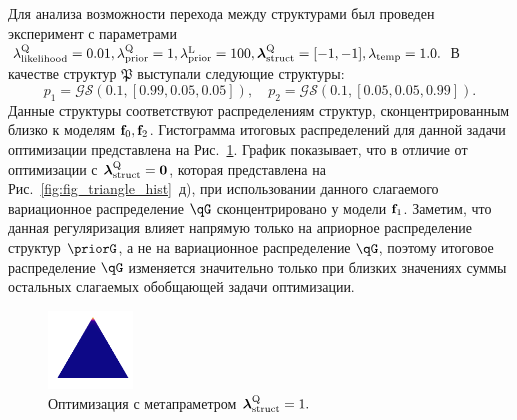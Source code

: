 Для анализа возможности перехода между структурами был проведен эксперимент с параметрами 
$\lambda_\text{likelihood}^\text{Q} = 0.01, \lambda_\text{prior}^\text{Q} = 1, \lambda_\text{prior}^\text{L} = 100, \boldsymbol{\lambda}_\text{struct}^\text{Q} = [-1, -1], \lambda_{\text{temp}} = 1.0.$
В качестве структур $\mathfrak{P}$ выступали следующие структуры:
\[
    p_1  =  \mathcal{GS}(0.1, [0.99, 0.05, 0.05]), \quad p_2  =  \mathcal{GS}(0.1, [0.05, 0.05, 0.99]).
\]
Данные структуры соответствуют распределениям структур, сконцентрированным близко к моделям $\mathbf{f}_0, \mathbf{f}_2$.
Гистограмма итоговых распределений для данной задачи оптимизации представлена на Рис.~\ref{fig:structure_comb_example}.
График показывает, что в отличие от оптимизации с $\boldsymbol{\lambda}_\text{struct}^\text{Q}=\mathbf{0}$, которая представлена на Рис.~\ref{fig:fig_triangle_hist}~д), при использовании данного слагаемого вариационное распределение $\qG$ сконцентрировано у модели $\mathbf{f}_1$.
Заметим, что данная регуляризация  влияет напрямую только на априорное распределение структур $\priorG$, а не на вариационное распределение $\qG$, поэтому итоговое распределение $\qG$ изменяется значительно только при близких значениях суммы остальных слагаемых обобщающей задачи оптимизации.




\begin{figure}
\centering
\includegraphics[width=0.2\textwidth]{plots/experiment_structures/triangle_structure_comb.png}
\caption{Оптимизация с метапраметром $\boldsymbol{\lambda}_\text{struct}^\text{Q}=1.$}
\label{fig:structure_comb_example}
\end{figure}
